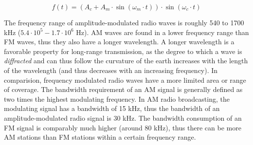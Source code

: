 $$f(t) = (A_c + A_m \cdot \sin(\omega_m \cdot t)) \cdot \sin(\omega_c \cdot t)$$

The frequency range of amplitude-modulated radio waves is roughly 540 to 1700 kHz ($5.4 \cdot 10^5 - 1.7 \cdot 10^6$ Hz). AM waves are found in a lower frequency range than FM waves, thus they also have a longer wavelength. A longer wavelength is a favorable property for long-range transmission, as the degree to which a wave is \emph{diffracted} and can thus follow the curvature of the earth increases with the length of the wavelength (and thus decreases with an increasing frequency). In comparision, frequency modulated radio waves have a more limited area or range of coverage. The bandwidth requirement of an AM signal is generally defined as two times the highest modulating frequency. In AM radio broadcasting, the modulating signal has a bandwidth of 15 kHz, thus the bandwidth of an amplitude-modulated radio signal is 30 kHz. The bandwidth consumption of an FM signal is comparably much higher (around 80 kHz), thus there can be more AM stations than FM stations within a certain frequency range. 

